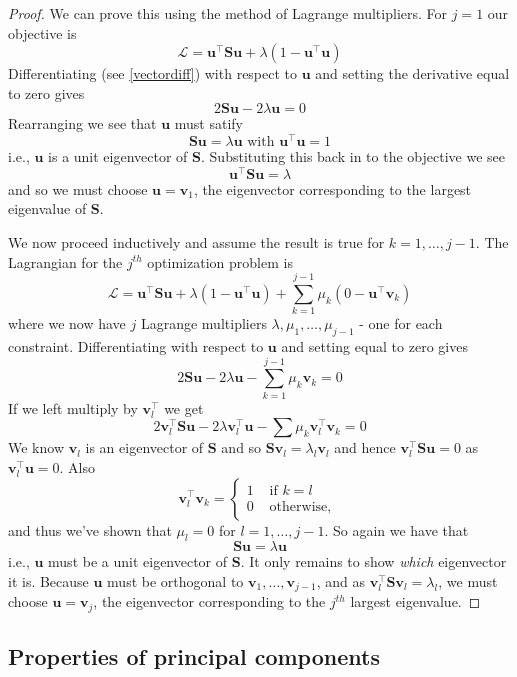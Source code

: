 \documentclass[
]{book}
\theoremstyle{definition}
\theoremstyle{definition}
\theoremstyle{definition}
\theoremstyle{definition}
\theoremstyle{remark}
\begin{document}
\begin{proof}
We can prove this using the method of Lagrange multipliers. For \(j=1\) our objective is
\[\mathcal{L} = \mathbf u^\top  \mathbf S\mathbf u+\lambda(1-\mathbf u^\top \mathbf u)\]
Differentiating (see \ref{vectordiff}) with respect to \(\mathbf u\) and setting the derivative equal to zero gives
\[2\mathbf S\mathbf u-2\lambda \mathbf u=0\]
Rearranging we see that \(\mathbf u\) must satify
\[\mathbf S\mathbf u=\lambda \mathbf u\mbox{ with } \mathbf u^\top \mathbf u=1\]
i.e., \(\mathbf u\) is a unit eigenvector of \(\mathbf S\). Substituting this back in to the objective we see
\[\mathbf u^\top \mathbf S\mathbf u= \lambda\]
and so we must choose \(\mathbf u=\mathbf v_1\), the eigenvector corresponding to the largest eigenvalue of \(\mathbf S\).

We now proceed inductively and assume the result is true for \(k=1, \ldots, j-1\). The Lagrangian for the \(j^{th}\) optimization problem is
\[\mathcal{L} = \mathbf u^\top  \mathbf S\mathbf u+\lambda(1-\mathbf u^\top \mathbf u) +\sum_{k=1}^{j-1}\mu_k (0-\mathbf u^\top \mathbf v_k)\]
where we now have \(j\) Lagrange multipliers \(\lambda, \mu_1, \ldots, \mu_{j-1}\) - one for each constraint.
Differentiating with respect to \(\mathbf u\) and setting equal to zero gives
\[2\mathbf S\mathbf u- 2\lambda \mathbf u- \sum_{k=1}^{j-1} \mu_k\mathbf v_k=0 \]
If we left multiply by \(\mathbf v_l^\top\) we get
\[2\mathbf v_l^\top \mathbf S\mathbf u- 2\lambda \mathbf v_l^\top \mathbf u- \sum \mu_k \mathbf v_l^\top \mathbf v_k =0\]
We know \(\mathbf v_l\) is an eigenvector of \(\mathbf S\) and so \(\mathbf S\mathbf v_l=\lambda_l \mathbf v_l\) and hence \(\mathbf v_l^\top \mathbf S\mathbf u=0\) as \(\mathbf v_l^\top \mathbf u=0\). Also \[\mathbf v_l^\top\mathbf v_k=\begin{cases}1 &\mbox{ if } k=l\\
0 &\mbox{ otherwise, }\end{cases}\] and thus we've shown that \(\mu_l=0\) for \(l=1, \ldots, j-1\). So again we have that \[\mathbf S\mathbf u= \lambda \mathbf u\]
i.e., \(\mathbf u\) must be a unit eigenvector of \(\mathbf S\). It only remains to show \emph{which} eigenvector it is. Because \(\mathbf u\) must be orthogonal to \(\mathbf v_1, \ldots, \mathbf v_{j-1}\),
and as \(\mathbf v_l^\top \mathbf S\mathbf v_l = \lambda_l\), we must choose \(\mathbf u=\mathbf v_j\), the eigenvector corresponding to the \(j^{th}\) largest eigenvalue.
\end{proof}

\subsection{Properties of principal components}\label{properties-of-principal-components}
\end{document}
